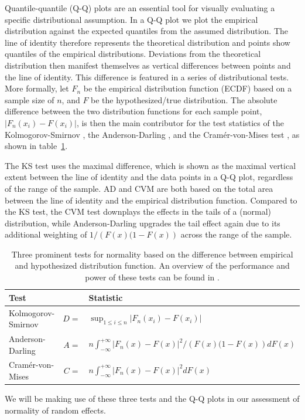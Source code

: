 \documentclass[12pt]{article} %
\begin{document}
Quantile-quantile (Q-Q) plots \citep{Wilk:1968} are an essential tool for  visually evaluating a specific distributional assumption. In a Q-Q plot we plot the empirical distribution against the expected quantiles from the assumed distribution. The line of identity therefore represents the theoretical distribution and points show quantiles of the empirical distributions. Deviations from the theoretical distribution then manifest themselves as vertical differences between points and the line of identity. This difference is featured in a series of distributional tests. More formally, let $F_n$ be the empirical distribution function (ECDF) based on a sample size of $n$, and $F$ be the hypothesized/true distribution. The absolute difference between the two distribution functions for each sample point, $\left| F_n(x_i) - F(x_i) \right|$, is then the main contributor for the test statistics of the Kolmogorov-Smirnov \cite[KS-test,][]{kolmogorov:1933, smirnov:1948}, the Anderson-Darling \citep[AD-test,][]{adtest:1954}, and the Cram\'{e}r-von-Mises test \citep[CVM-test,][]{cramer:1928, mises:1928}, as shown in table~\ref{tab:tests}.

The KS test uses the maximal  difference, which is shown as the maximal vertical extent between the line of identity and the data points in a Q-Q plot, regardless of the range of the sample.  AD and CVM  are both based on the total area between the line of identity and the empirical distribution function. Compared to the KS  test,  the CVM test downplays the effects in the tails of a (normal) distribution, while Anderson-Darling upgrades the tail effect again due to its additional weighting of $1/\left(F(x)(1 - F(x)\right)$ across the range of the sample. 
\begin{table}
\begin{tabular}{lrl}\hline
Test && Statistic\\\hline\hline
Kolmogorov-Smirnov & $D =$ & $ \sup_{1 \le i \le n} \left | F_n(x_i) - F(x_i)\right|$ \\
Anderson-Darling & $A =$ & $ n \int_{-\infty}^{+\infty} \left | F_n(x) - F(x)\right|^2/\left(F(x)(1 - F(x)\right) dF(x)$\\
Cram\'{e}r-von-Mises & $C =$ & $n \int_{-\infty}^{+\infty} \left | F_n(x) - F(x)\right|^2 dF(x)$ \\\hline
\end{tabular}
\caption{\label{tab:tests} Three prominent tests for normality based on the difference between empirical and hypothesized distribution function. An overview of the performance and power of these tests can be found in \citet{stephens:1974}.}
\end{table}
%
We will be making use of these three tests and the Q-Q plots in our assessment of normality of random effects.
\end{document}
